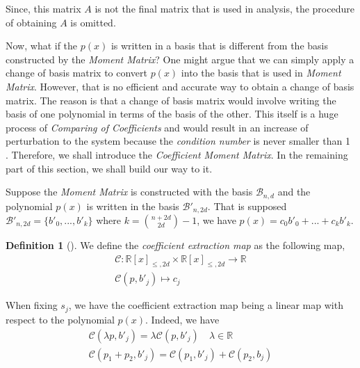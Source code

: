 \documentclass[12pt]{amsart}
\numberwithin{equation}{section}
\theoremstyle{definition}
\newtheorem{definition}[thm]{Definition}
\numberwithin{thm}{section}
\begin{document}
Since, this matrix $A$ is not the final matrix that is used in analysis, the procedure of obtaining $A$ is omitted. 

\smallskip

Now, what if the $p(x)$ is written in a basis that is different from the basis constructed by the \emph{Moment Matrix}?
One might argue that we can simply apply a change of basis matrix to convert $p(x)$ into the basis that is used in \emph{Moment Matrix}. 
However, that is no efficient and accurate way to obtain a change of basis matrix. 
The reason is that a change of basis matrix would involve writing the basis of one polynomial in terms of the basis of the other. 
This itself is a huge process of \emph{Comparing of Coefficients} and would result in an increase of perturbation to the system because the \emph{condition number} is never smaller than 1 \cite{golub1996matrix}.
Therefore, we shall introduce the \emph{Coefficient Moment Matrix}. In the remaining part of this section, we shall build our way to it.

Suppose the \emph{Moment Matrix} is constructed with the basis $\mathcal{B}_{n, d}$ and the polynomial $p(x)$ is written in the basis $\mathcal{B}'_{n, 2d}$. 
That is supposed $\mathcal{B}'_{n, 2d} = \{b'_0, ..., b'_k\}$ where $k = {n + 2d \choose 2d} - 1$, we have $p(x) = c_0b'_0 + ... + c_kb'_k$.
\begin{definition}[\cite{Recher:Masterthesis}]
     \label{def:cem}
We define the \emph{coefficient extraction map} as the following map,
\begin{equation*}
     \begin{split}
     \mathcal{C}: \mathbb{R}[x]_{\leq, 2d} \times \mathbb{R}[x]_{\leq, 2d} \rightarrow \mathbb{R} \\
     \mathcal{C}(p, b'_j) \mapsto c_j
     \end{split}
\end{equation*}
\end{definition}

\smallskip
When fixing $s_j$, we have the {coefficient extraction map} being a linear map with respect to the polynomial $p(x)$. Indeed, we have 
\begin{equation*}
     \begin{split}
          \mathcal{C}(\lambda p, b'_j) = \lambda \mathcal{C}(p, b'_j) \quad \lambda \in \mathbb{R}
          \\
          \mathcal{C}(p_1 + p_2, b'_j) = \mathcal{C}(p_1, b'_j) + \mathcal{C}(p_2, b_j)
     \end{split}
\end{equation*}
\end{document}
